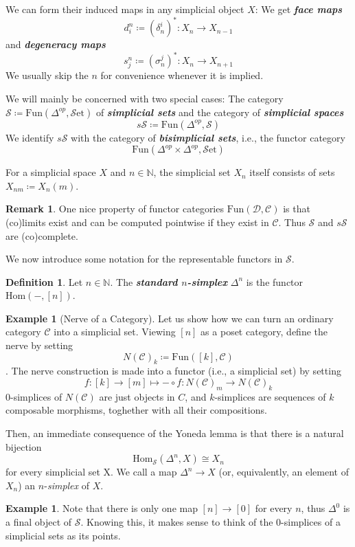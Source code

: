 \documentclass{article}
\newcommand{\textbi}[1]{\textbf{\textit{#1}}}
\newcommand{\C}{\mathscr{C}}
\newcommand{\D}{\mathscr{D}}
\newcommand{\bN}{\mathbb{N}}
\newcommand{\cS}{\mathcal{S}}
\newcommand{\Hom}{\mathrm{Hom}}
\newcommand{\Set}{\cS\mathrm{et}}
\newcommand{\sS}{s\cS}
\newcommand{\Fun}{\mathrm{Fun}}
\theoremstyle{definition}
\newtheorem{defin}[subsection]{Definition}
\newtheorem{rem}[subsection]{Remark}
\newtheorem{ex}[subsection]{Example}
\begin{document}
We can form their induced maps in any simplicial object $X$: \newline We get \textbi{face maps} $$d^n_i\coloneqq (\delta_n^i)^*: X_n\to X_{n-1}$$ and \textbi{degeneracy maps} $$s^n_j\coloneqq (\sigma_n^j)^*: X_n\to X_{n+1}$$ 
We usually skip the $n$ for convenience whenever it is implied.

We will mainly be concerned with two special cases: The category $\cS\coloneqq\Fun(\Delta^{op}, \Set)$  of \textbi{simplicial sets} and the category of \textbi{simplicial spaces} $$\sS\coloneqq\Fun(\Delta^{op}, \cS)$$ We identify $\sS$ with the category of \textbi{bisimplicial sets}, i.e., the functor category $$\Fun(\Delta^{op}\times\Delta^{op}, \Set)$$
\par For a simplicial space $X$ and $n\in \bN$, the simplicial set $X_n$ itself consists of sets $X_{nm}\coloneqq X_n(m)$.

\begin{rem}
    One nice property of functor categories $\Fun(\D,\C)$ is that (co)limits exist and can be computed pointwise if they exist in $\C$. Thus $\cS$ and $\sS$ are (co)complete.
\end{rem}

We now introduce some notation for the representable functors in $\cS$.

\begin{defin}
    Let $n\in\bN$. The \textbi{standard $n$-simplex} $\Delta^n$ is the functor $\Hom(-,[n])$.
\end{defin}

\begin{ex}[Nerve of a Category]
    Let us show how we can turn an ordinary category $\C$ into a simplicial set. Viewing $[n]$ as a poset category, define the nerve by setting $$N(\C)_k\coloneqq \Fun([k],\C)$$. The nerve construction is made into a functor (i.e., a simplicial set) by setting $$f:[k]\to [m]\mapsto -\circ f:N(\C)_m\to N(\C)_k$$ $0$-simplices of $N(\C)$ are just objects in $C$, and $k$-simplices are sequences of $k$ composable morphisms, toghether with all their compositions.
\end{ex}

Then, an immediate consequence of the Yoneda lemma is that there is a natural bijection $$\Hom_{\cS}(\Delta^n, X)\cong X_n$$ for every simplicial set X. We call a map $\Delta^n\to X$ (or, equivalently, an element of $X_n$) an $n$-\textit{simplex} of $X$. 

\begin{ex}
    Note that there is only one map $[n]\to [0]$ for every $n$, thus $\Delta^0$ is a final object of $\cS$. Knowing this, it makes sense to think of the $0$-simplices of a simplicial sets as its points.
\end{ex}
\end{document}
